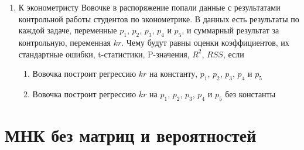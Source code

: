 \documentclass[pdftex,12pt,a4paper]{article}
\newcommand{\solution}[1]{ {\tiny #1} }
\begin{document}
\begin{enumerate}
\item К эконометристу Вовочке в распоряжение попали данные с результатами контрольной работы студентов по эконометрике. В данных есть результаты по каждой задаче, переменные $p_1$, $p_2$, $p_3$, $p_4$ и $p_5$, и суммарный результат за контрольную, переменная $kr$. Чему будут равны оценки коэффициентов, их стандартные ошибки, t-статистики, P-значения, $R^2$, $RSS$, если
\begin{enumerate}
\item Вовочка построит регрессию $kr$ на константу, $p_1$, $p_2$, $p_3$, $p_4$ и $p_5$
\item Вовочка построит регрессию $kr$ на $p_1$, $p_2$, $p_3$, $p_4$ и $p_5$ без константы
\end{enumerate}
\solution{}

\end{enumerate}

\section{МНК без матриц и вероятностей}
\end{document}
